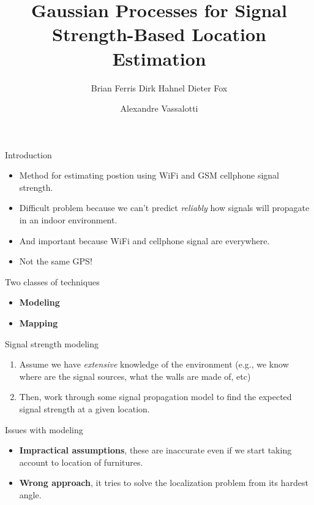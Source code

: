 \documentclass{beamer}
\title{Gaussian Processes for Signal Strength-Based Location Estimation}
\subtitle{Brian Ferris \quad Dirk Hahnel \quad Dieter Fox}
\author{Alexandre Vassalotti}
\begin{document}
\begin{frame}[plain]
  \titlepage
\end{frame}

\begin{frame}{Introduction}
  \begin{itemize}
  \item Method for estimating postion using WiFi and GSM cellphone signal
    strength.
  \item Difficult problem because we can't predict \emph{reliably} how signals
    will propagate in an indoor environment.
  \item And important because WiFi and cellphone signal are everywhere.
  \item Not the same GPS!
  \end{itemize}
\end{frame}

\begin{frame}{Two classes of techniques}
  \begin{itemize}
  \item \textbf{Modeling}
  \item \textbf{Mapping}
  \end{itemize}
\end{frame}

\begin{frame}{Signal strength modeling}
  \begin{enumerate}
  \item Assume we have \emph{extensive} knowledge of the environment (e.g., we
    know where are the signal sources, what the walls are made of, etc)
  \item Then, work through some signal propagation model to find the expected
    signal strength at a given location.
  \end{enumerate}
\end{frame}

\begin{frame}{Issues with modeling}
  \begin{itemize}
  \item \textbf{Impractical assumptions}, these are inaccurate even if we
    start taking account to location of furnitures.
  \item \textbf{Wrong approach}, it tries to solve the localization problem
    from its hardest angle.
  \end{itemize}
\end{frame}
\end{document}
